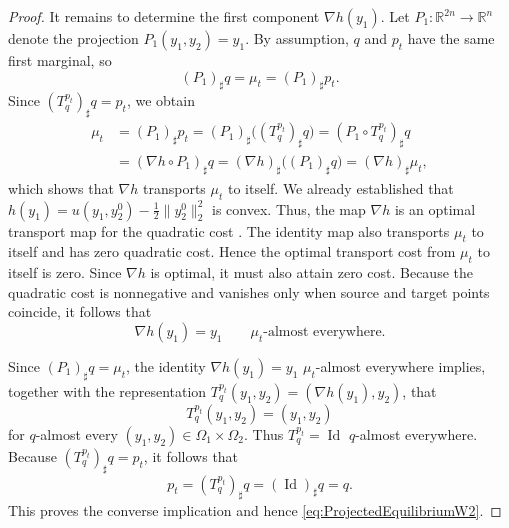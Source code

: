 \documentclass[oneside,11pt]{article}
\theoremstyle{remark}
\newcommand{\R}{\mathbb{R}}
\begin{document}
\begin{proof}
It remains to determine the first component $\nabla h(y_1)$. Let
$P_1:\R^{2n}\to\R^n$ denote the projection
$P_1(y_1,y_2)=y_1$. By assumption, $q$ and $p_t$ have the same first
marginal, so
\[
    (P_1)_\sharp q
    =
    \mu_t
    =
    (P_1)_\sharp p_t.
\]
Since $(T_q^{p_t})_\sharp q=p_t$, we obtain
\begin{align*}
    \mu_t
    &=
    (P_1)_\sharp p_t= (P_1)_\sharp\bigl((T_q^{p_t})_\sharp q\bigr)=
    (P_1\circ T_q^{p_t})_\sharp q\\
    &=
    (\nabla h\circ P_1)_\sharp q=
    (\nabla h)_\sharp\bigl((P_1)_\sharp q\bigr)=
    (\nabla h)_\sharp\mu_t,
\end{align*}
which shows that $\nabla h$ transports $\mu_t$ to itself. We already established that  $h(y_1)=u(y_1,y_2^0)-\frac12\|y_2^0\|_2^2$ is convex. Thus, the map $\nabla h$ is an optimal transport map for the quadratic cost \cite[Theorem~2.13]{Ambrosio2013}. The identity map also transports $\mu_t$ to itself and has zero quadratic cost. Hence the optimal transport cost from $\mu_t$ to itself is zero. Since $\nabla h$ is optimal, it must also attain zero cost. Because the quadratic cost is nonnegative and vanishes only when source and target points coincide, it follows that
\[
    \nabla h(y_1)=y_1
    \qquad
    \mu_t\text{-almost everywhere}.
\]

Since $(P_1)_\sharp q=\mu_t$, the identity $\nabla h(y_1)=y_1$ $\mu_t$-almost everywhere implies, together with the representation $T_q^{p_t}(y_1,y_2)=(\nabla h(y_1),y_2)$, that
\[
    T_q^{p_t}(y_1,y_2) = (y_1,y_2)
\]
for $q$-almost every $(y_1,y_2)\in\Omega_1\times\Omega_2$. Thus $T_q^{p_t}=\operatorname{Id}$ $q$-almost everywhere. Because  $(T_q^{p_t})_\sharp q=p_t$, it follows that
\[
p_t = (T_q^{p_t})_\sharp q = (\operatorname{Id})_\sharp q= q.
\]
This proves the converse implication and hence \eqref{eq:ProjectedEquilibriumW2}.
\end{proof}
\end{document}
